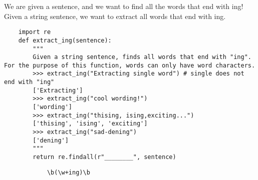\begin{blocksection}
    \question We are given a sentence, and we want to find all the words that end with ing! Given a string sentence, we want to extract all words that end with ing.
    
    \begin{lstlisting}
    import re
    def extract_ing(sentence):
        """
        Given a string sentence, finds all words that end with "ing". For the purpose of this function, words can only have word characters.
        >>> extract_ing("Extracting single word") # single does not end with "ing"
        ['Extracting']
        >>> extract_ing("cool wording!")
        ['wording']
        >>> extract_ing("thising, ising,exciting...")
        ['thising', 'ising', 'exciting']
        >>> extract_ing("sad-dening")
        ['dening']
        """
        return re.findall(r"________", sentence)
    \end{lstlisting}
    
    \begin{solution}[2in]
        \begin{lstlisting}
            \b(\w+ing)\b
        \end{lstlisting}
    \end{solution}
    \end{blocksection}
    